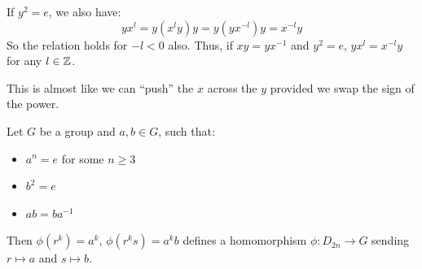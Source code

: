 \documentclass[../main.tex]{subfiles}
\begin{document}
If $y^2 = e$, we also have:
\[
  yx^{l} = y(x^{l}y)y = y(yx^{-l})y=x^{-l}y
\]
So the relation holds for $-l < 0$ also.
Thus, if $xy = yx^{-1}$ and $y^2 = e$, $yx^{l} = x^{-l}y$ for any $l \in \mathbb{Z}$.
\begin{remark}[Memorisation]
  This is almost like we can ``push'' the $x$ across the $y$ provided we swap the sign of the power.
\end{remark}
\begin{lemma}
  Let $G$ be a group and $a, b \in G$, such that: \label{dihedralLemma}
  \begin{itemize}
    \item $a^{n} = e$ for some $n \geq 3$
    \item $b^2 = e$
    \item $ab = ba^{-1}$
  \end{itemize}
  Then $\phi(r^{k}) = a^{k}$, $\phi(r^{k}s) = a^{k}b$ defines a homomorphism $\phi: D_{2n} \to G$ sending $r \mapsto a$ and $s \mapsto b$.
\end{lemma}
\end{document}
